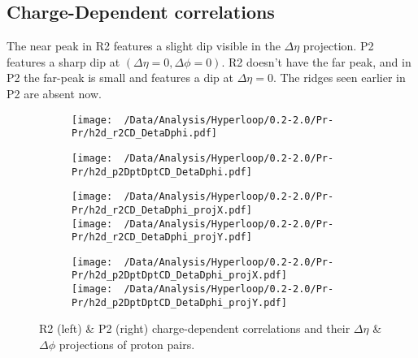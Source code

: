 \documentclass[12pt,a4paper,twoside]{report}
\begin{document}
\subsection{Charge-Dependent correlations}
The near peak in R2 features a slight dip visible in the $\Delta\eta$ projection. P2 features a sharp dip at $(\Delta\eta=0,\Delta\phi=0)$. R2 doesn't have the far peak, and in P2 the far-peak is small and features a dip at $\Delta\eta=0$. The ridges seen earlier in P2 are absent now.
\begin{figure}[H]
	\begin{subfigure}{0.49\linewidth}
		\texttt{[image: ~/Data/Analysis/Hyperloop/0.2-2.0/Pr-Pr/h2d\_r2CD\_DetaDphi.pdf]}\\
	\end{subfigure}
	\begin{subfigure}{0.49\linewidth}
		\texttt{[image: ~/Data/Analysis/Hyperloop/0.2-2.0/Pr-Pr/h2d\_p2DptDptCD\_DetaDphi.pdf]}\\
	\end{subfigure}
\end{figure}
\begin{figure}[H]
	\ContinuedFloat
	\begin{subfigure}{0.49\linewidth}
		\texttt{[image: ~/Data/Analysis/Hyperloop/0.2-2.0/Pr-Pr/h2d\_r2CD\_DetaDphi\_projX.pdf]}\\
		\texttt{[image: ~/Data/Analysis/Hyperloop/0.2-2.0/Pr-Pr/h2d\_r2CD\_DetaDphi\_projY.pdf]}\\
	\end{subfigure}
	\begin{subfigure}{0.49\linewidth}
		\texttt{[image: ~/Data/Analysis/Hyperloop/0.2-2.0/Pr-Pr/h2d\_p2DptDptCD\_DetaDphi\_projX.pdf]}\\
		\texttt{[image: ~/Data/Analysis/Hyperloop/0.2-2.0/Pr-Pr/h2d\_p2DptDptCD\_DetaDphi\_projY.pdf]}\\
	\end{subfigure}
	\caption{R2 (left) \& P2 (right) charge-dependent correlations and their $\Delta\eta$ \& $\Delta\phi$ projections of proton pairs.}
\end{figure}
\end{document}
